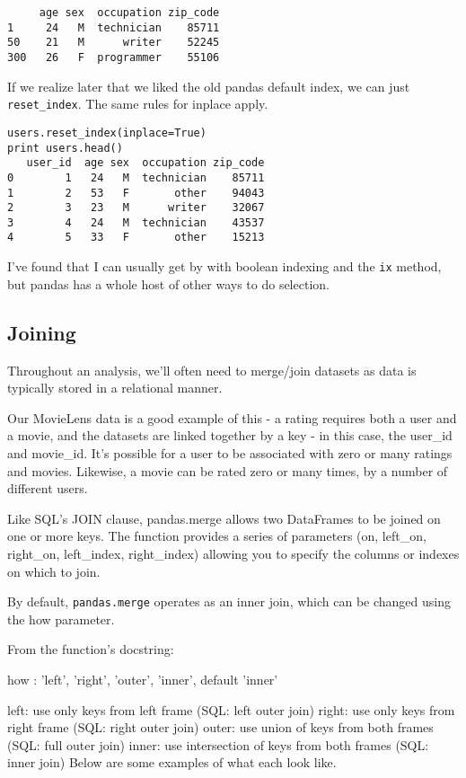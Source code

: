 \begin{framed}
\begin{framed}
\begin{framed}
\begin{framed}
\begin{framed}
\begin{framed}
\begin{framed}
\begin{framed}
\begin{framed}
\begin{framed}
\begin{framed}
\begin{verbatim}
     age sex  occupation zip_code
1     24   M  technician    85711
50    21   M      writer    52245
300   26   F  programmer    55106
\end{verbatim}


If we realize later that we liked the old pandas default index, we can just \texttt{reset\_index}. The same rules for inplace apply.
\begin{framed}
\begin{verbatim}
users.reset_index(inplace=True)
print users.head()
   user_id  age sex  occupation zip_code
0        1   24   M  technician    85711
1        2   53   F       other    94043
2        3   23   M      writer    32067
3        4   24   M  technician    43537
4        5   33   F       other    15213
\end{verbatim}



I've found that I can usually get by with boolean indexing and the \texttt{ix} method, but pandas has a whole host of other ways to do selection.


\subsection{Joining}

Throughout an analysis, we'll often need to merge/join datasets as data is typically stored in a relational manner.

Our MovieLens data is a good example of this - a rating requires both a user and a movie, and the datasets are linked together by a key - in this case, the user\_id and movie\_id. It's possible for a user to be associated with zero or many ratings and movies. Likewise, a movie can be rated zero or many times, by a number of different users.

Like SQL's JOIN clause, pandas.merge allows two DataFrames to be joined on one or more keys. The function provides a series of parameters (on, left\_on, right\_on, left\_index, right\_index) allowing you to specify the columns or indexes on which to join.

By default, \texttt{pandas.merge} operates as an inner join, which can be changed using the how parameter.

From the function's docstring:

how : {'left', 'right', 'outer', 'inner'}, default 'inner'

left: use only keys from left frame (SQL: left outer join)
right: use only keys from right frame (SQL: right outer join)
outer: use union of keys from both frames (SQL: full outer join)
inner: use intersection of keys from both frames (SQL: inner join)
Below are some examples of what each look like.



\end{framed}
\end{framed}
\end{framed}
\end{framed}
\end{framed}
\end{framed}
\end{framed}
\end{framed}
\end{framed}
\end{framed}
\end{framed}
\end{framed}
